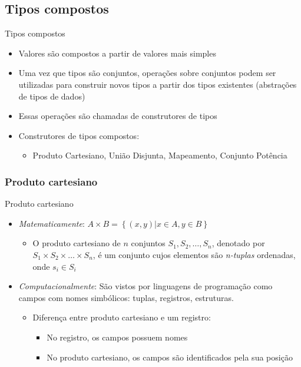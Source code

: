 \documentclass[handout]{beamer}
\begin{document}
\subsection{Tipos compostos}

\begin{frame}{Tipos compostos}

   \begin{itemize}
		\item Valores são compostos a partir de valores mais simples
		\item Uma vez que tipos são conjuntos, operações sobre conjuntos podem ser utilizadas para construir novos tipos a partir dos tipos existentes (abstrações de tipos de dados)
		\item Essas operações são chamadas de construtores de tipos

   \item Construtores de tipos compostos:
      \begin{itemize}
      \item Produto Cartesiano, União Disjunta, Mapeamento, Conjunto Potência
      \end{itemize}
	\end{itemize}
\end{frame}


\subsubsection{Produto cartesiano}

\begin{frame}{Produto cartesiano}
		\begin{itemize}
			\item \textit{Matematicamente}: $A \times B = \left\{ (x, y) | x \in A, y \in B \right\}$
				\begin{itemize}
					\item O produto cartesiano de $n$ conjuntos $S_1, S_2, \ldots, S_n$,
				denotado por $S_1 \times S_2 \times \ldots \times S_n$, é um conjunto cujos elementos são \textit{n-tuplas} ordenadas, onde $s_i \in S_i$
				\end{itemize}

			\item \textit{Computacionalmente}: São vistos por linguagens de programação como campos com nomes simbólicos: tuplas, registros, estruturas.
				\begin{itemize}
					\item Diferença entre produto cartesiano e um registro:
					\begin{itemize}
						\item No registro, os campos possuem nomes
						\item No produto cartesiano, os campos são identificados pela sua posição
					\end{itemize}
				\end{itemize}
		\end{itemize}
 \end{frame}
\end{document}
